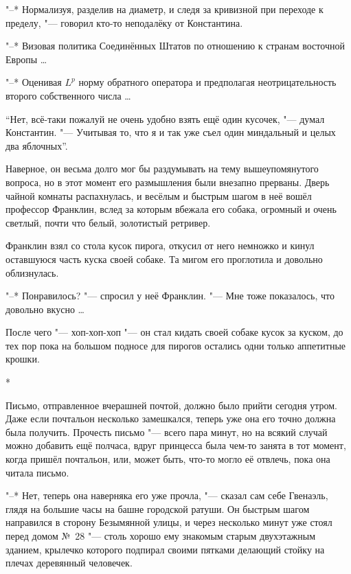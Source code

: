 "--* Нормализуя, разделив на диаметр, и следя за кривизной при переходе к
пределу, "--- говорил кто-то неподалёку от Константина.

"--* Визовая политика Соединённых Штатов по отношению к странам восточной
Европы \ldots

"--* Оценивая $L^p$ норму обратного оператора и предполагая неотрицательность
второго собственного числа \ldots

\enquote{Нет, всё-таки пожалуй не очень удобно взять ещё один кусочек, "---
думал Константин.
"--- Учитывая то, что я и так уже съел один миндальный и целых два яблочных}.

Наверное, он весьма долго мог бы раздумывать на тему вышеупомянутого вопроса, но
в этот момент его размышления были внезапно прерваны.
Дверь чайной комнаты распахнулась, и весёлым и быстрым шагом в неё вошёл
профессор Франклин, вслед за которым вбежала его собака, огромный и очень
светлый, почти что белый, золотистый ретривер.

Франклин взял со стола кусок пирога, откусил от него немножко и кинул оставшуюся
часть куска своей собаке.
Та мигом его проглотила и довольно облизнулась.

"--* Понравилось? "--- спросил у неё Франклин.
"--- Мне тоже показалось, что довольно вкусно \ldots

После чего "--- хоп-хоп-хоп "--- он стал кидать своей собаке кусок за куском,
до тех пор пока на большом подносе для пирогов остались одни только аппетитные
крошки.

\medskip
\begin{center}
*\quad*\quad*
\end{center}

\medskip
Письмо, отправленное вчерашней почтой, должно было прийти сегодня утром.
Даже если почтальон несколько замешкался, теперь уже она его точно должна была
получить.
Прочесть письмо "--- всего пара минут, но на всякий случай можно добавить ещё
полчаса, вдруг принцесса была чем-то занята в тот момент, когда пришёл
почтальон, или, может быть, что-то могло её отвлечь, пока она читала письмо.

"--* Нет, теперь она наверняка его уже прочла, "--- сказал сам себе Гвенаэль,
глядя на большие часы на башне городской ратуши.
Он быстрым шагом направился в сторону Безымянной улицы, и через несколько минут
уже стоял перед домом №~28 "--- столь хорошо ему знакомым старым двухэтажным
зданием, крылечко которого подпирал своими пятками делающий стойку на плечах
деревянный человечек.

